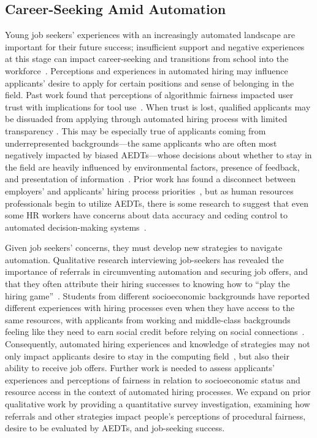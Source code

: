 \subsection{Career-Seeking Amid Automation}
Young job seekers' experiences with an increasingly automated landscape are important for their future success; insufficient support and negative experiences at this stage can impact career-seeking and transitions from school into the workforce~\cite{bock2013women, giannakos2017understanding, jones1986socialization, begel2008novice}. Perceptions and experiences in automated hiring may influence applicants' desire to apply for certain positions and sense of belonging in the field. Past work found that perceptions of algorithmic fairness impacted user trust with implications for tool use~\cite{woodruff2018qualitative}. 
When trust is lost, qualified applicants may be dissuaded from applying through automated hiring process with limited transparency \cite{van2021job}. This may be especially true of applicants coming from underrepresented backgrounds---the same applicants who are often most negatively impacted by biased AEDTs---whose decisions about whether to stay in the field are heavily influenced by environmental factors, presence of feedback, and presentation of information~\cite{bock2013women, giannakos2017understanding, metaxa2018gender}.
Prior work has found a disconnect between employers' and applicants' hiring process priorities~\cite{friedrich1993primary}, but as human resources professionals begin to utilize AEDTs, there is some research to suggest that even some HR workers have concerns about data accuracy and ceding control to automated decision-making systems~\cite{li2021algorithmic}. 

Given job seekers' concerns, they must develop new strategies to navigate automation. Qualitative research interviewing job-seekers has revealed the importance of referrals in circumventing automation and securing job offers, and that they often attribute their hiring successes to knowing how to ``play the hiring game''~\cite{armstrong2023navigating, chua2021playing}. Students from different socioeconomic backgrounds have reported different experiences with hiring processes even when they have access to the same resources, with applicants from working and middle-class backgrounds feeling like they need to earn social credit before relying on social connections~\cite{chua2021playing}. Consequently, automated hiring experiences and knowledge of strategies may not only impact applicants desire to stay in the computing field~\cite{olson2014opportunities}, but also their ability to receive job offers. Further work is needed to assess applicants' experiences and perceptions of fairness in relation to socioeconomic status and resource access in the context of automated hiring processes. We expand on prior qualitative work by providing a quantitative survey investigation, examining how referrals and other strategies impact people's perceptions of procedural fairness, desire to be evaluated by AEDTs, and job-seeking success. 